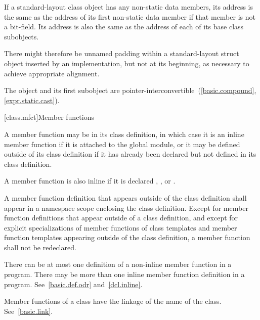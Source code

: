 \pnum
If a standard-layout class object has any non-static data members, its address
is the same as the address of its first non-static data member
if that member is not a bit-field. Its
address is also the same as the address of each of its base class subobjects.
\begin{note}
There might therefore be unnamed padding within a standard-layout struct object
inserted by an implementation, but
not at its beginning, as necessary to achieve appropriate alignment.
\end{note}
\begin{note}
The object and its first subobject are
pointer-interconvertible~(\ref{basic.compound}, \ref{expr.static.cast}).
\end{note}

[class.mfct]{Member functions}%

\pnum
{}%
%
A member function may be  in its class definition,
in which case it is an inline member function
if it is attached to the global module, or
it may be defined outside of its class
definition if it has already been declared but not defined in its class
definition.
\begin{note}
A member function is also inline if it is declared
, , or .
\end{note}

\pnum
A member function definition that appears outside of the
class definition shall appear in a namespace scope enclosing the class
definition. Except for member function definitions that appear outside
of a class definition, and except for explicit specializations of member
functions of class templates and member function
templates appearing outside of the class definition, a
member function shall not be redeclared.
\begin{note}
There can be at most one definition of a non-inline member function in
a program. There may be more than one
inline member function definition in a program.
See~\ref{basic.def.odr} and~\ref{dcl.inline}.
\end{note}
\begin{note}
Member functions of a class have the linkage of the name of the class.
See~\ref{basic.link}.
\end{note}

